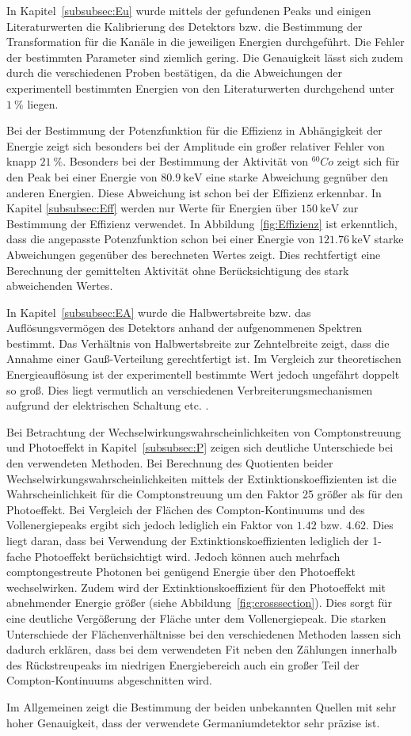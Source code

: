 In Kapitel~\ref{subsubsec:Eu} wurde mittels der gefundenen Peaks und einigen Literaturwerten
die Kalibrierung des Detektors bzw. die Bestimmung der Transformation für die Kanäle
in die jeweiligen Energien durchgeführt. Die Fehler der bestimmten Parameter
sind ziemlich gering. Die Genauigkeit lässt sich zudem durch die
verschiedenen Proben bestätigen, da die Abweichungen der experimentell bestimmten
Energien von den Literaturwerten durchgehend unter $\SI{1}{\percent}$ liegen.

Bei der Bestimmung der Potenzfunktion für die Effizienz in Abhängigkeit der Energie
zeigt sich besonders bei der Amplitude ein großer relativer Fehler von knapp
$\SI{21}{\percent}$. Besonders bei der Bestimmung der Aktivität von $^{60}{Co}$
zeigt sich für den Peak bei
einer Energie von $\SI{80.9}{\kilo\eV}$ eine starke Abweichung gegnüber den anderen
Energien. Diese Abweichung ist schon bei der Effizienz erkennbar. In Kapitel
\ref{subsubsec:Eff} werden nur Werte für Energien über $\SI{150}{\kilo\eV}$ zur
Bestimmung der Effizienz verwendet. In Abbildung~\ref{fig:Effizienz} ist erkenntlich,
dass die angepasste Potenzfunktion schon bei einer Energie von $\SI{121.76}{\kilo\eV}$
starke Abweichungen gegenüber des berechneten Wertes zeigt. Dies rechtfertigt eine
Berechnung der gemittelten Aktivität ohne Berücksichtigung des stark abweichenden
Wertes.

In Kapitel~\ref{subsubsec:EA} wurde die Halbwertsbreite bzw. das Auflösungsvermögen
des Detektors anhand der aufgenommenen Spektren bestimmt. Das Verhältnis von
Halbwertsbreite zur Zehntelbreite zeigt, dass die Annahme einer Gauß-Verteilung
gerechtfertigt ist. Im Vergleich zur theoretischen Energieauflösung ist der
experimentell bestimmte Wert jedoch ungefährt doppelt so groß. Dies liegt vermutlich
an verschiedenen Verbreiterungsmechanismen aufgrund der elektrischen Schaltung etc. .

Bei Betrachtung der Wechselwirkungswahrscheinlichkeiten von Comptonstreuung und
Photoeffekt in Kapitel~\ref{subsubsec:P} zeigen sich deutliche Unterschiede
bei den verwendeten Methoden. Bei Berechnung des Quotienten beider
Wechselwirkungswahrscheinlichkeiten mittels der Extinktionskoeffizienten
ist die Wahrscheinlichkeit für die Comptonstreuung um den Faktor 25 größer als
für den Photoeffekt. Bei Vergleich der Flächen des Compton-Kontinuums und des
Vollenergiepeaks ergibt sich jedoch lediglich ein Faktor von $\num{1.42}$
bzw. $\num{4.62}$. Dies liegt daran, dass bei Verwendung der Extinktionskoeffizienten
lediglich der 1-fache Photoeffekt berüchsichtigt wird. Jedoch können auch mehrfach
comptongestreute Photonen bei genügend Energie über den Photoeffekt wechselwirken.
Zudem wird der Extinktionskoeffizient für den Photoeffekt mit abnehmender Energie
größer (siehe Abbildung~\ref{fig:crosssection}). Dies sorgt für eine deutliche
Vergößerung der Fläche unter dem Vollenergiepeak. Die starken Unterschiede der
Flächenverhältnisse bei den verschiedenen Methoden lassen sich dadurch erklären,
dass bei dem verwendeten Fit neben den Zählungen innerhalb des Rückstreupeaks
im niedrigen Energiebereich auch ein großer Teil der Compton-Kontinuums
abgeschnitten wird.

Im Allgemeinen zeigt die Bestimmung der beiden unbekannten Quellen mit sehr hoher
Genauigkeit, dass der verwendete Germaniumdetektor sehr präzise ist.

